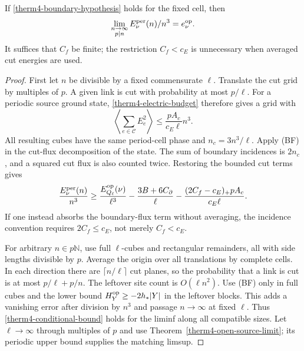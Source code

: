 \begin{proposition}
\label{therm4-conditional-periodic}
If \eqref{therm4-boundary-hypothesis} holds for the fixed cell, then
\[
 \lim_{\substack{n\to\infty\\p\mid n}}
       E_\nu^{\rm per}(n)/n^3=e_\nu^{\rm op}.
\]
It suffices that $C_f$ be finite; the restriction $C_f<c_E$ is
unnecessary when averaged cut energies are used.
\end{proposition}
\begin{proof}
First let $n$ be divisible by a fixed commensurate $\ell$.
Translate the cut grid by multiples of $p$.  A given link is cut with
probability at most $p/\ell$.  For a periodic source ground state,
\eqref{therm4-electric-budget} therefore gives a grid with
\begin{equation}
 \left\langle\sum_{e\in\mathcal C}E_e^2\right\rangle
 \le\frac{pA_c}{c_E\ell}n^3.
 \label{therm4-cut-average}
\end{equation}
All resulting cubes have the same period-cell phase and
$n_c=3n^3/\ell$.  Apply (BF) in the cut-flux decomposition of the
state.  The sum of boundary incidences is $2n_c$, and a squared
cut flux is also counted twice.  Restoring the bounded cut terms
gives
\begin{equation}
 \frac{E_\nu^{\rm per}(n)}{n^3}
 \ge\frac{E_{Q_\ell}^{\rm op}(\nu)}{\ell^3}
 -\frac{3B+6C_\partial}{\ell}
 -\frac{(2C_f-c_E)_+pA_c}{c_E\ell}.
 \label{therm4-conditional-bound}
\end{equation}
If one instead absorbs the boundary-flux term without averaging,
the incidence convention requires $2C_f\le c_E$, not merely
$C_f<c_E$.

For arbitrary $n\in p\mathbb N$, use full $\ell$-cubes and
rectangular remainders, all with side lengths divisible by $p$.
Average the origin over all translations by complete cells.
In each direction there are $\lceil n/\ell\rceil$ cut planes, so
the probability that a link is cut is at most
$p/\ell+p/n$.  The leftover site count is $O(\ell n^2)$.
Use (BF) only in full cubes and the lower bound
$H_Y^{\rm op}\ge-2h_*|Y|$ in the leftover blocks.  This adds a
vanishing error after division by $n^3$ and passage $n\to\infty$
at fixed $\ell$.  Thus \eqref{therm4-conditional-bound} holds for
the liminf along all compatible sizes.
Let $\ell\to\infty$ through multiples of $p$ and use
Theorem~\ref{therm4-open-source-limit}; its periodic upper bound
supplies the matching limsup.
\end{proof}

